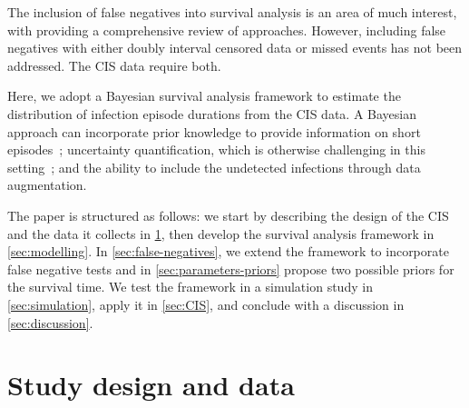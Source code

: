 \documentclass[12pt]{article}
\begin{document}
The inclusion of false negatives into survival analysis is an area of much interest, with
\citet{piresIntervalMisclassify} providing a comprehensive review of approaches. However, including false negatives with either doubly interval censored data or missed events has not been addressed. The CIS data require both.

Here, we adopt a Bayesian survival analysis framework to estimate the distribution of infection episode durations from the CIS data.
A Bayesian approach can incorporate prior knowledge to provide information on short episodes~\citep{caoBias}; uncertainty quantification, which is otherwise challenging in this setting~\citep{sunStatistical,dengNonparametric}; and the ability to include the undetected infections through data augmentation.

The paper is structured as follows: we start by describing the design of the CIS and the data it collects in \cref{sec:data}, then develop the survival analysis framework in \cref{sec:modelling}.
In \cref{sec:false-negatives}, we extend the framework to incorporate false negative tests and in \cref{sec:parameters-priors} propose two possible priors for the survival time.
We test the framework in a simulation study in \cref{sec:simulation}, apply it in \cref{sec:CIS}, and conclude with a discussion in \cref{sec:discussion}.


\section{Study design and data} \label{sec:data}
\end{document}
